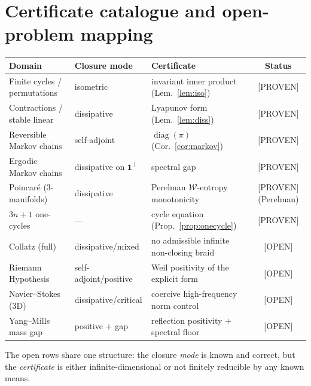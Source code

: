 \documentclass[11pt]{article}
\theoremstyle{definition}
\theoremstyle{plain}
\theoremstyle{remark}
\newcommand{\PROVEN}{\textcolor{green!45!black}{\textsf{[PROVEN]}}}
\newcommand{\OPEN}{\textcolor{red!65!black}{\textsf{[OPEN]}}}
\begin{document}
\section{Certificate catalogue and open-problem mapping}

\begin{center}\small
\begin{tabular}{@{}lllc@{}}
\hline
\textbf{Domain} & \textbf{Closure mode} & \textbf{Certificate} & \textbf{Status}\\
\hline
Finite cycles / permutations & isometric & invariant inner product (Lem.~\ref{lem:iso}) & \PROVEN\\
Contractions / stable linear & dissipative & Lyapunov form (Lem.~\ref{lem:diss}) & \PROVEN\\
Reversible Markov chains & self-adjoint & $\operatorname{diag}(\pi)$ (Cor.~\ref{cor:markov}) & \PROVEN\\
Ergodic Markov chains & dissipative on $\mathbf1^\perp$ & spectral gap & \PROVEN\\
Poincar\'e (3-manifolds) & dissipative & Perelman $\mathcal W$-entropy monotonicity & \PROVEN (Perelman)\\
$3n{+}1$ one-cycles & --- & cycle equation (Prop.~\ref{prop:onecycle}) & \PROVEN\\
\hline
Collatz (full) & dissipative/mixed & no admissible infinite non-closing braid & \OPEN\\
Riemann Hypothesis & self-adjoint/positive & Weil positivity of the explicit form & \OPEN\\
Navier--Stokes (3D) & dissipative/critical & coercive high-frequency norm control & \OPEN\\
Yang--Mills mass gap & positive $+$ gap & reflection positivity $+$ spectral floor & \OPEN\\
\hline
\end{tabular}
\end{center}

\noindent The open rows share one structure: the closure \emph{mode} is known and
correct, but the \emph{certificate} is either infinite-dimensional or not finitely
reducible by any known means.
\end{document}
